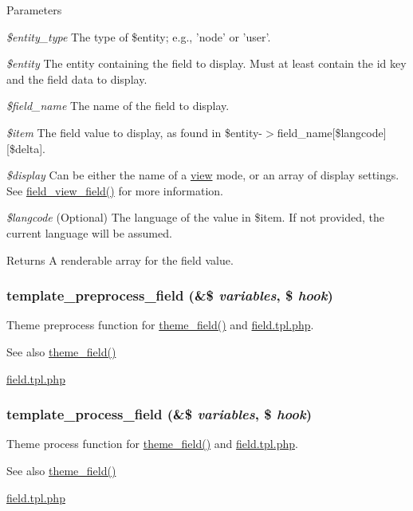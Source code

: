 \begin{DoxyParams}{Parameters}
\item[{\em \$entity\_\-type}]The type of \$entity; e.g., 'node' or 'user'. \item[{\em \$entity}]The entity containing the field to display. Must at least contain the id key and the field data to display. \item[{\em \$field\_\-name}]The name of the field to display. \item[{\em \$item}]The field value to display, as found in \$entity-\/$>$field\_\-name\mbox{[}\$langcode\mbox{]}\mbox{[}\$delta\mbox{]}. \item[{\em \$display}]Can be either the name of a \hyperlink{classview}{view} mode, or an array of display settings. See \hyperlink{group__field_gacb7c7349bbe181c174421e23210ae1ba}{field\_\-view\_\-field()} for more information. \item[{\em \$langcode}](Optional) The language of the value in \$item. If not provided, the current language will be assumed. \end{DoxyParams}
\begin{DoxyReturn}{Returns}
A renderable array for the field value. 
\end{DoxyReturn}
\hypertarget{group__field_ga6dc60d3c482230f380dd3b112487d717}{
\subsubsection[{template\_\-preprocess\_\-field}]{\setlength{\rightskip}{0pt plus 5cm}template\_\-preprocess\_\-field (\&\$ {\em variables}, \/  \$ {\em hook})}}
\label{group__field_ga6dc60d3c482230f380dd3b112487d717}
Theme preprocess function for \hyperlink{group__themeable_gaee35966f09683ab054aef8f6fd022d2c}{theme\_\-field()} and \hyperlink{field_8tpl_8php}{field.tpl.php}.

\begin{DoxySeeAlso}{See also}
\hyperlink{group__themeable_gaee35966f09683ab054aef8f6fd022d2c}{theme\_\-field()} 

\hyperlink{field_8tpl_8php}{field.tpl.php} 
\end{DoxySeeAlso}
\hypertarget{group__field_ga4fd3ce05ef61810b1f66283302ab7cad}{
\subsubsection[{template\_\-process\_\-field}]{\setlength{\rightskip}{0pt plus 5cm}template\_\-process\_\-field (\&\$ {\em variables}, \/  \$ {\em hook})}}
\label{group__field_ga4fd3ce05ef61810b1f66283302ab7cad}
Theme process function for \hyperlink{group__themeable_gaee35966f09683ab054aef8f6fd022d2c}{theme\_\-field()} and \hyperlink{field_8tpl_8php}{field.tpl.php}.

\begin{DoxySeeAlso}{See also}
\hyperlink{group__themeable_gaee35966f09683ab054aef8f6fd022d2c}{theme\_\-field()} 

\hyperlink{field_8tpl_8php}{field.tpl.php} 
\end{DoxySeeAlso}
